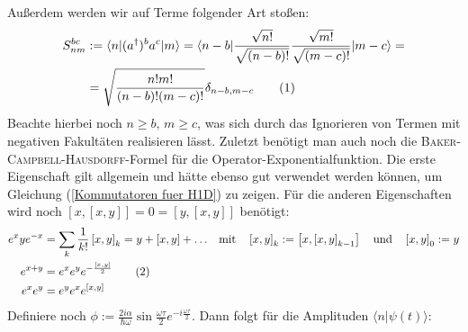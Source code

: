 \documentclass[a4paper,12pt]{article}
\newcommand\numberthis{\addtocounter{equation}{1}\tag{\theequation}}
\newcommand{\brak}{}
\newcommand{\braket}{}
\newcommand{\klam}{}
\newcommand{\tecxt}{}
\begin{document}
Außerdem werden wir auf Terme folgender Art stoßen:
\begin{align*}
S_{nm}^{bc}&:=\braket\langle {n} | {(a^\dagger)^ba^c} | {m}\rangle=\braket\langle {n-b} | {\frac{\sqrt{n!}}{\sqrt{(n-b)!}}\frac{\sqrt{m!}}{\sqrt{(m-c)!}}} | {m-c}\rangle=\\
&=\sqrt{\frac{n!m!}{(n-b)!(m-c)!}}\delta_{n-b,m-c}\numberthis\label{S nm bc Elemente}
\end{align*}
Beachte hierbei noch $n\ge b,\,m\ge c$, was sich durch das Ignorieren von Termen mit negativen Fakultäten realisieren lässt. Zuletzt benötigt man auch noch die \textsc{Baker-Campbell-Hausdorff}-Formel für die Operator-Exponentialfunktion. Die erste Eigenschaft gilt allgemein und hätte ebenso gut verwendet werden können, um Gleichung (\ref{Kommutatoren fuer H1D}) zu zeigen. Für die anderen Eigenschaften wird noch $\klam\left[ {x,\klam\left[ {x,y} \right]} \right]=0=\klam\left[ {y,\klam\left[ {x,y} \right]} \right]$ benötigt:
\begin{align*}
e^xye^{-x}&=\sum_k\frac{1}{k!}\klam\left[ {x,y} \right]_k=y+\klam\left[ {x,y} \right]+\dots &\tecxt\text{mit }\ \ \klam\left[ {x,y} \right]_k&:=\klam\left[ {x,\klam\left[ {x,y} \right]_{k-1}} \right]\ \ \tecxt\text{ und }\ \ \klam\left[ {x,y} \right]_0:=y\\
e^{x+y}&=e^xe^ye^{-\frac{[x,y]}{2}}\numberthis\label{Hausdorff Exponential}\\
e^xe^y&=e^ye^xe^{[x,y]}
\end{align*}
Definiere noch $\phi:=\frac{2i\alpha}{\hbar\omega}\sin\frac{\omega\tau}{2}e^{-i\frac{\omega\tau}{2}}$. Dann folgt für die Amplituden $\brak\langle {n}| {\psi(t)}\rangle$:
\end{document}
